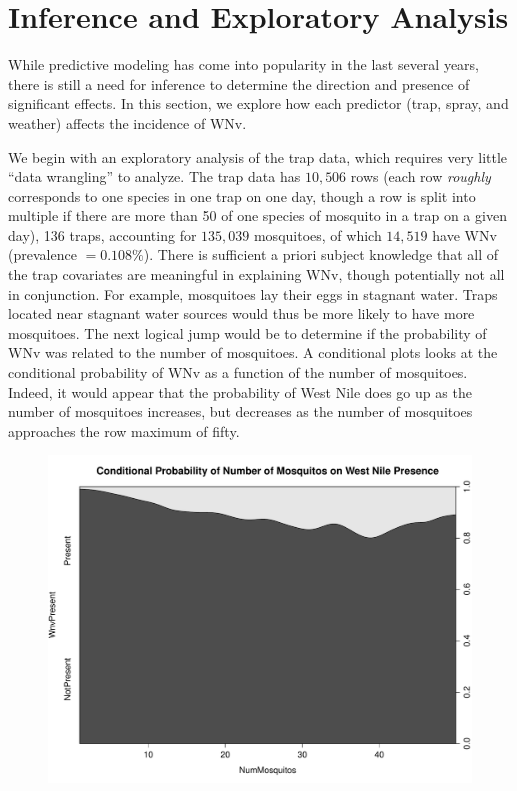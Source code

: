 \documentclass[12pt]{article}
\begin{document}
\section{Inference and Exploratory Analysis}
While predictive modeling has come into popularity in the last several years, there is still a need for inference to determine the direction and presence of significant effects. In this section, we explore how each predictor (trap, spray, and weather) affects the incidence of WNv.

We begin with an exploratory analysis of the trap data, which requires very little ``data wrangling'' to analyze. The trap data has $10,506$ rows (each row \emph{roughly} corresponds to one species in one trap on one day, though a row is split into multiple if there are more than 50 of one species of mosquito in a trap on a given day), 136 traps, accounting for $135,039$ mosquitoes, of which $14,519$ have WNv (prevalence $= 0.108\%$). There is sufficient a priori subject knowledge that all of the trap covariates are meaningful in explaining WNv, though potentially not all in conjunction. For example, mosquitoes lay their eggs in stagnant water. Traps located near stagnant water sources would thus be more likely to have more mosquitoes. The next logical jump would be to determine if the probability of WNv was related to the number of mosquitoes. A conditional plots looks at the conditional probability of WNv as a function of the number of mosquitoes. Indeed, it would appear that the probability of West Nile does go up as the number of mosquitoes increases, but decreases as the number of mosquitoes approaches the row maximum of fifty.
\begin{figure}[H] \center
\includegraphics[scale=.30]{CD_NumMos_WNv.pdf}
\end{figure}
\end{document}
